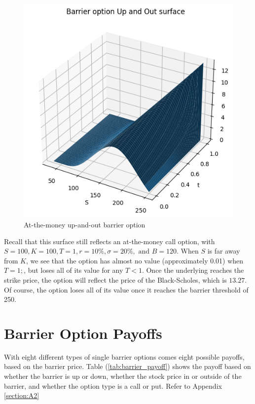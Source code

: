 \begin{figure}[H]
	\centering
	\includegraphics[width=.40\linewidth]{content/images/bs_surface.png}
	\caption{At-the-money up-and-out barrier option}
	\label{fig:bs_surfrace}
\end{figure}
Recall that this surface still reflects an at-the-money call option, with $S=100,K=100, T=1, r=10\%,\sigma=20\%, \text{ and }B=120$. When $S$ is far away from $K$, we see that the option has almost no value (approximately 0.01) when $T=1;$, but loses all of its value for any $T<1$. Once the underlying reaches the strike price, the option will reflect the price of the Black-Scholes, which is $13.27$. Of course, the option loses all of its value once it reaches the barrier threshold of 250.

\section{Barrier Option Payoffs}

With eight different types of single barrier options comes eight possible payoffs, based on the barrier price. Table (\ref{tab:barrier_payoff}) shows the payoff based on whether the barrier is up or down, whether the stock price in or outside of the barrier, and whether the option type is a call or put. Refer to Appendix \ref{section:A2}

